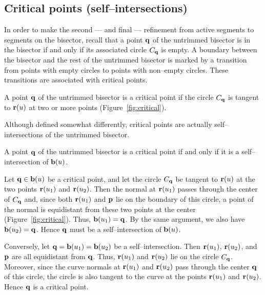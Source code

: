 \subsection{Critical points (self--intersections)}

In order to make the second --- and final --- refinement from active
segments to segments on the bisector, recall that a point ${\bf q}$ of
the untrimmed bisector is in the bisector if and only if its associated
circle $C_{\bf q}$ is empty. A boundary between the bisector and the
rest of the untrimmed bisector is marked by a transition from points
with empty circles to points with non--empty circles. These transitions
are associated with critical points.

\begin{dfn}
\label{d:cri}
A point ${\bf q}$ of the untrimmed bisector is a {\rm critical point}
if the circle $C_{\bf q}$ is tangent to ${\bf r}(u)$ at two or more
points (Figure~\ref{fig:critical}).
\end{dfn}


Although defined somewhat differently, critical points are actually
self--intersections of the untrimmed bisector.

\begin{propn}
\label{prop:cri}
A point ${\bf q}$ of the untrimmed bisector is a critical point if and
only if it is a self--intersection of ${\bf b}(u)$.
\end{propn}

\prf Let ${\bf q} \in {\bf b}(u)$ be a critical point, and let the
circle $C_{\bf q}$ be tangent to ${\bf r}(u)$ at the two points
${\bf r}(u_1)$ and ${\bf r}(u_2)$. Then the normal at ${\bf r}(u_1)$
passes through the center of $C_{\bf q}$ and, since both ${\bf r}
(u_1)$ and ${\bf p}$ lie on the boundary of this circle, a point
of the normal is equidistant from these two points at the center
(Figure~\ref{fig:critical}). Thus, ${\bf b}(u_{1}) = {\bf q}$. By
the same argument, we also have ${\bf b}(u_{2}) = {\bf q}$. Hence
${\bf q}$ must be a self--intersection of ${\bf b}(u)$.

Conversely, let ${\bf q}={\bf b}(u_{1})={\bf b}(u_{2})$ be a
self--intersection. Then ${\bf r}(u_{1})$, ${\bf r}(u_{2})$, and
${\bf p}$ are all equidistant from ${\bf q}$. Thus, ${\bf r}(u_{1})$
and ${\bf r}(u_{2})$ lie on the circle $C_{\bf q}$. Moreover, since
the curve normals at ${\bf r}(u_{1})$ and ${\bf r}(u_{2})$ pass
through the center ${\bf q}$ of this circle, the circle is also
tangent to the curve at the points ${\bf r}(u_{1})$ and ${\bf r}
(u_{2})$. Hence ${\bf q}$ is a critical point. \QED

